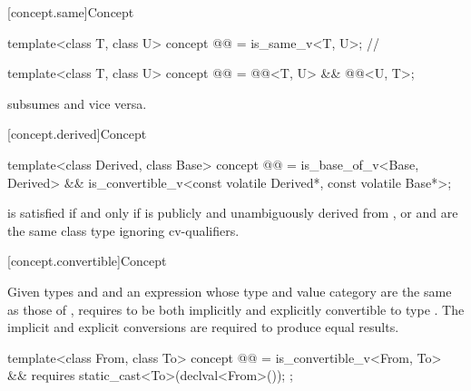 [concept.same]{Concept }

\begin{itemdecl}
template<class T, class U>
  concept @@ = is_same_v<T, U>;       // \expos

template<class T, class U>
  concept @@ = @@<T, U> && @@<U, T>;
\end{itemdecl}

\begin{itemdescr}
\pnum
\begin{note}
 subsumes  and
vice versa.
\end{note}
\end{itemdescr}

[concept.derived]{Concept }

\begin{itemdecl}
template<class Derived, class Base>
  concept @@ =
    is_base_of_v<Base, Derived> &&
    is_convertible_v<const volatile Derived*, const volatile Base*>;
\end{itemdecl}

\begin{itemdescr}
\pnum
\begin{note}
 is satisfied if and only if
 is publicly and unambiguously derived from , or
 and  are the same class type ignoring cv-qualifiers.
\end{note}
\end{itemdescr}

[concept.convertible]{Concept }

\pnum
Given types  and  and
an expression 
whose type and value category are the same as those of ,
 requires 
to be both implicitly and explicitly convertible to type .
The implicit and explicit conversions are required to produce equal
results.

\begin{itemdecl}
template<class From, class To>
  concept @@ =
    is_convertible_v<From, To> &&
    requires {
      static_cast<To>(declval<From>());
    };
\end{itemdecl}

